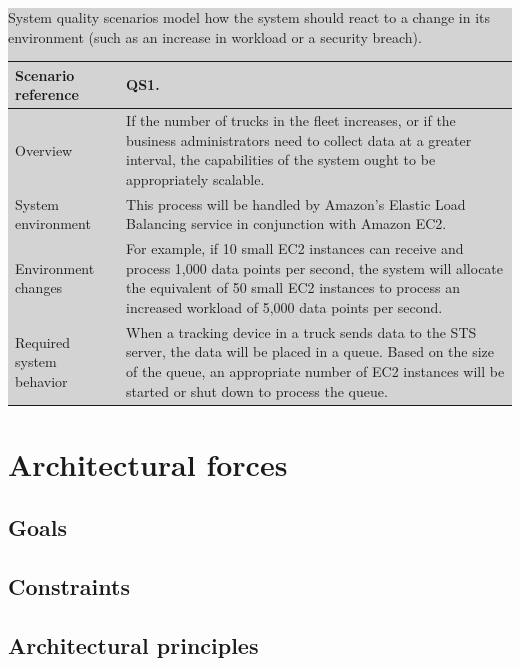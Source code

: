 \documentclass[a4paper,11pt]{report}
\newcommand{\instructions}[1]{
  \noindent\colorbox{lightgray}{%
    \parbox{\linewidth}{%
      #1
    }%
  }%
 \vspace{0.1cm}
}
\begin{document}
\instructions{
  System quality scenarios model how the system should react to a change
  in its environment (such as an increase in workload or a security
  breach).

\begin{center}
  \begin{tabular}[h!]{| >{\columncolor{gray}}p{0.28\textwidth} | p{0.65\textwidth} |}
    \hline
    Scenario reference & QS1. \\
    \hline
    Overview & If the number of trucks in the fleet increases, or if the business
    administrators need to collect data at a greater interval, the capabilities
    of the system ought to be appropriately scalable.\\
    \hline
    System environment & This process will be handled
    by Amazon's Elastic Load Balancing service in conjunction with Amazon EC2.\\
    \hline
    Environment changes & For example, if 10 small EC2
    instances can receive and process 1,000 data points per second, the system will
    allocate the equivalent of 50 small EC2 instances to process an increased
    workload of 5,000 data points per second.\\
    \hline
    Required system behavior & When a tracking device in
    a truck sends data to the STS server, the data will be placed in a queue.
    Based on the size of the queue, an appropriate number of EC2 instances will
    be started or shut down to process the queue.\\
    \hline
  \end{tabular}
\end{center}
}

\chapter{Architectural forces}
\label{cha:architectural-forces}
\thispagestyle{fancy}

\section{Goals}
\label{sec:goals}

\section{Constraints}
\label{sec:constraints}

\section{Architectural principles}
\label{sec:arch-princ}
\end{document}

